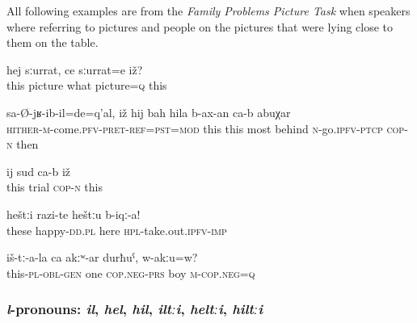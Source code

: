 All following examples are from the \textit{Family Problems Picture Task} when speakers where referring to pictures and people on the pictures that were lying close to them on the table.
%
\begin{exe}
	\ex	\label{This picture, what picture is it/this}
	\gll	hej	sːurrat,	ce	sːurrat=e	iž?\\
		this	picture	what	picture=\textsc{q}	this\\
	\glt	{}

	\ex	\label{This is when he came back; this (iž) then needs to be the (hij) very last}
	\gll	sa-Ø-jʁ-ib-il=de=q'al,	iž	hij	bah	hila	b-ax-an ca-b	abuχar\\
		\textsc{hither-m}-come.\textsc{pfv}-\textsc{pret}-\textsc{ref}=\textsc{pst}=\textsc{mod}	this	this	most	behind	\textsc{n}-go.\textsc{ipfv}-\textsc{ptcp} \textsc{cop-n}	then\\
	\glt	{}

	\ex	\label{This (iž) is the (ij) trial}
	\gll	ij	sud	ca-b	iž\\
		this	trial	\textsc{cop-n}	this\\
	\glt {}
	
\ex	\label{These happy ones (=happy people on a picture) give them here!}
	\gll	heštːi	razi-te	heštːu	b-iqː-a! \\
		these	happy-\textsc{dd}\textsc{.pl} 	here	\textsc{hpl}-take.out.\textsc{ipfv}-\textsc{imp}\\
	\glt	{}

	\ex	\label{They have only one son, right?}
	\gll	iš-tː-a-la	ca	akːʷ-ar	durħuˁ,	w-akːu=w?\\
		this-\textsc{pl}-\textsc{obl}-\textsc{gen}	one	\textsc{cop.neg}-\textsc{prs} boy	\textsc{m}-\textsc{cop.neg}=\textsc{q}\\
	\glt	{}


\end{exe}



\subsubsection{\textit{l}-pronouns: \textit{il}, \textit{hel}, \textit{hil}, \textit{iltːi}, \textit{heltːi}, \textit{hiltːi}}
\label{sssec:l-pronouns}

